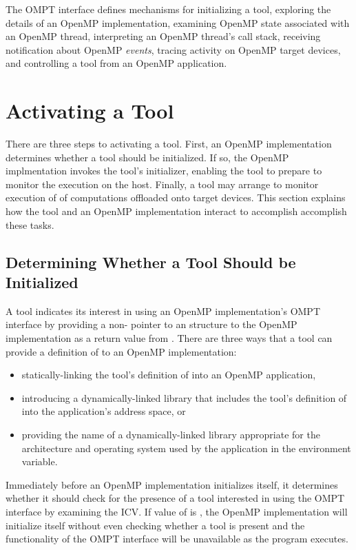 The OMPT interface defines mechanisms for initializing a tool,
exploring the details of an OpenMP implementation, examining OpenMP state
associated with an OpenMP thread, interpreting an OpenMP thread's call stack,
receiving notification about OpenMP \emph{events}, tracing activity on 
OpenMP target devices, and controlling a tool from an OpenMP application.

\section{Activating a Tool}
\label{sec:ompt-initialization}

There are three steps to activating a tool. First, an OpenMP
implementation determines whether a tool should be initialized.  If
so, the OpenMP implmentation invokes the tool's initializer, enabling
the tool to prepare to monitor the execution on the host. Finally, a
tool may arrange to monitor execution of of computations offloaded
onto target devices. This section explains how the tool and an 
OpenMP implementation interact to accomplish accomplish these tasks.

\subsection{Determining Whether a Tool Should be Initialized}
\label{sec:ompt-check-tool}

A tool indicates its interest in using an OpenMP implementation's OMPT interface 
by providing a non- pointer to an 
structure to the OpenMP implementation as a return value from 
. There are three ways
that a tool can provide a definition of  to an
OpenMP implementation:

\begin{itemize}
\item statically-linking the tool's definition of 
  into an OpenMP application, 
\item introducing a dynamically-linked library that includes the tool's definition
  of  into the application's address space, or 
\item providing the name of a dynamically-linked library appropriate
  for the architecture and operating system used by the application
  in the  environment variable.
\end{itemize}

Immediately before an OpenMP implementation initializes itself, it
determines whether it should check for the presence of a tool
interested in using the OMPT interface by examining the 
ICV.  If value of  is , the OpenMP
implementation will initialize itself without even checking whether a
tool is present and the functionality of the OMPT interface will be
unavailable as the program executes.
 
